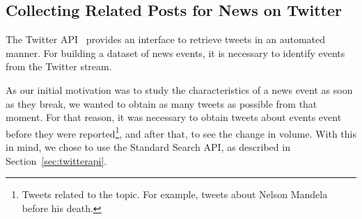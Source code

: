 
\subsection{Collecting Related Posts for News on Twitter}

The Twitter API~\cite{twitterapi} provides an interface to retrieve tweets in an
automated manner. For building a dataset of news events, it is necessary to
identify events from the Twitter stream.


As our initial motivation was to study the characteristics of a news event as
soon as they break, we wanted to obtain as many tweets as possible from that
moment.
%
For that reason, it was necessary to obtain tweets about events event before
they were reported\footnote{Tweets related to the topic. For example, tweets
about Nelson Mandela before his death.}, and after that, to see the change in
volume.
%
With this in mind, we chose to use the Standard Search API, as described in
Section~\ref{sec:twitterapi}.

